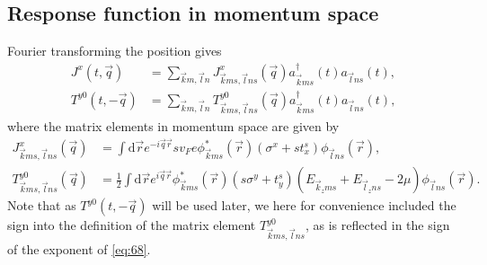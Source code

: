 \subsection{Response function in momentum space}
Fourier transforming the position gives
\begin{align}
  \label{eq:66}
  J^x(t, \vec{q}) &= \sum\limits_{\vec{k}m, \vec{l}n}
                    J^x_{\vec{k}ms, \vec{l}ns}(\vec{q})
                    a^{\dagger}_{\vec{k}ms}(t)
                    a_{\vec{l} ns}(t),\\
  \label{eq:67}
  T^{y 0}(t, -\vec{q}) &= \sum\limits_{\vec{k}m, \vec{l}n}^{}
                    T^{y 0}_{\vec{k}m s, \vec{l}n s}(\vec{q})
                    a^{\dagger}_{\vec{k}m s}(t)
                    a_{\vec{l} n s}(t),
\end{align}
where the matrix elements in momentum space are given by
\begin{align}
  J^x_{\vec{k}ms, \vec{l}ns}(\vec{q}) &=  \int \mathrm{d} \vec{r} e^{-i \vec{q} \vec{r}} s v_F e \phi ^{*}_{\vec{k}ms} (\vec{r}) (\sigma^x + s t^s_x) \phi _{\vec{l}ns}(\vec{r}),\\
  \label{eq:68}
  T^{y 0}_{\vec{k}m s, \vec{l} n s}(\vec{q}) &= \frac{1}{2}
                                                \int \mathrm{d}\vec{r} e^{i\vec{q}\vec{r}}
                                              \phi ^{*}_{\vec{k}m s}(\vec{r})
                                              (s \sigma ^y + t^s_y)
                                                (E_{\vec{k}_z m s} + E_{\vec{l}_z n  s} - 2 \mu ) \phi _{\vec{l} n  s}(\vec{r}).
\end{align}
Note that as $T^{y 0}(t, -\vec{q})$ will be used later, we here for convenience included the sign into the definition of the matrix element  $T^{y 0}_{\vec{k}ms, \vec{l}ns}$, as is reflected in the sign of the exponent of \cref{eq:68}.

